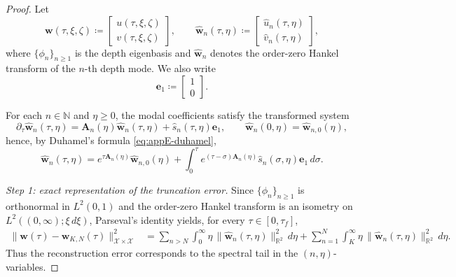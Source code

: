 \begin{proof}
    Let
    \[
        \mathbf w(\tau,\xi,\zeta)\coloneqq
        \begin{bmatrix}
            u(\tau,\xi,\zeta) \\[2pt]
            v(\tau,\xi,\zeta)
        \end{bmatrix},
        \qquad
        \widehat{\mathbf w}_n(\tau,\eta)\coloneqq
        \begin{bmatrix}
            \widehat u_n(\tau,\eta) \\[2pt]
            \widehat v_n(\tau,\eta)
        \end{bmatrix},
    \]
    where \(\{\phi_n\}_{n\ge 1}\) is the depth eigenbasis and
    \(\widehat{\mathbf w}_n\) denotes the order-zero Hankel transform of the
    \(n\)-th depth mode. We also write
    \[
        \mathbf e_1 \coloneqq
        \begin{bmatrix}
            1 \\[2pt]
            0
        \end{bmatrix}.
    \]

    For each \(n\in\mathbb N\) and \(\eta\ge 0\), the modal coefficients satisfy
    the transformed system
    \begin{equation}
        \partial_\tau \widehat{\mathbf w}_n(\tau,\eta)
        =
        \mathbf A_n(\eta)\widehat{\mathbf w}_n(\tau,\eta)
        +
        \widehat s_n(\tau,\eta)\mathbf e_1,
        \qquad
        \widehat{\mathbf w}_n(0,\eta)=\widehat{\mathbf w}_{n,0}(\eta),
        \label{eq:appE-proof-modal-ode}
    \end{equation}
    hence, by Duhamel's formula \eqref{eq:appE-duhamel},
    \begin{equation}
        \widehat{\mathbf w}_n(\tau,\eta)
        =
        e^{\tau \mathbf A_n(\eta)}\widehat{\mathbf w}_{n,0}(\eta)
        +
        \int_0^\tau
        e^{(\tau-\sigma)\mathbf A_n(\eta)}
        \widehat s_n(\sigma,\eta)\mathbf e_1\, d\sigma.
        \label{eq:appE-proof-duhamel}
    \end{equation}

    \smallskip
    \noindent
    \textit{Step 1: exact representation of the truncation error.}
    Since \(\{\phi_n\}_{n\ge 1}\) is orthonormal in \(L^2(0,1)\) and the
    order-zero Hankel transform is an isometry on
    \(L^2((0,\infty);\xi\,d\xi)\), Parseval's identity yields, for every
    \(\tau\in[0,\tau_f]\),
    \begin{align}
        \bigl\|\mathbf w(\tau)-\mathbf w_{K,N}(\tau)\bigr\|_{\mathcal X\times\mathcal X}^2
         & =
        \sum_{n>N}\int_0^\infty
        \eta\,\bigl\|\widehat{\mathbf w}_n(\tau,\eta)\bigr\|_{\mathbb R^2}^2\, d\eta
        +
        \sum_{n=1}^{N}\int_K^\infty
        \eta\,\bigl\|\widehat{\mathbf w}_n(\tau,\eta)\bigr\|_{\mathbb R^2}^2\, d\eta.
        \label{eq:appE-proof-tail-identity}
    \end{align}
    Thus the reconstruction error corresponds to the spectral tail in the
    \((n,\eta)\)-variables.


\end{proof}
